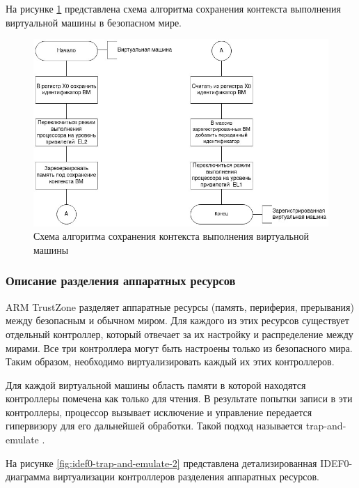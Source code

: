 На рисунке \ref{fig:save-context-algo} представлена схема алгоритма сохранения контекста выполнения виртуальной машины в безопасном мире.

\begin{figure}[h!]
	\centering
	\includegraphics[scale=0.6]{img/algo_2.jpg}
	\caption{Схема алгоритма сохранения контекста выполнения виртуальной машины}
	\label{fig:save-context-algo}
\end{figure}

\subsubsection{Описание разделения аппаратных ресурсов}

ARM TrustZone разделяет аппаратные ресурсы (память, периферия, прерывания) между безопасным и обычном миром. Для каждого из этих ресурсов существует отдельный контроллер, который отвечает за их настройку и распределение между мирами. Все три контроллера могут быть настроены только из безопасного мира. Таким образом, необходимо виртуализировать каждый их этих контроллеров.

Для каждой виртуальной машины область памяти в которой находятся контроллеры помечена как только для чтения. В результате попытки записи в эти контроллеры, процессор вызывает исключение и управление передается гипервизору для его дальнейшей обработки. Такой подход называется trap-and-emulate \cite{trap-and-emulate}. 

На рисунке \ref{fig:idef0-trap-and-emulate-2} представлена детализированная IDEF0-диаграмма виртуализации контроллеров разделения аппаратных ресурсов. 

